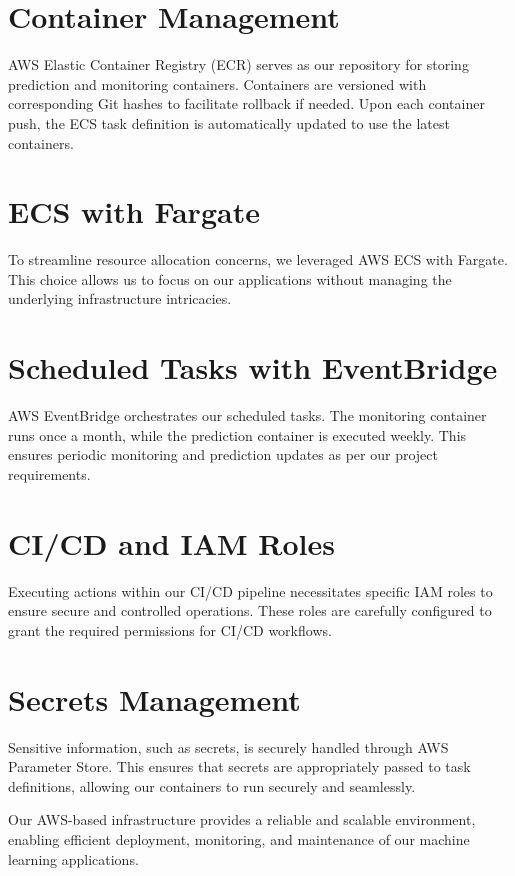 \documentclass{report}
\begin{document}
\section{Container Management}

AWS Elastic Container Registry (ECR) serves as our repository for storing prediction and monitoring containers. Containers are versioned with corresponding Git hashes to facilitate rollback if needed. Upon each container push, the ECS task definition is automatically updated to use the latest containers.

\section{ECS with Fargate}

To streamline resource allocation concerns, we leveraged AWS ECS with Fargate. This choice allows us to focus on our applications without managing the underlying infrastructure intricacies.

\section{Scheduled Tasks with EventBridge}

AWS EventBridge orchestrates our scheduled tasks. The monitoring container runs once a month, while the prediction container is executed weekly. This ensures periodic monitoring and prediction updates as per our project requirements.

\section{CI/CD and IAM Roles}

Executing actions within our CI/CD pipeline necessitates specific IAM roles to ensure secure and controlled operations. These roles are carefully configured to grant the required permissions for CI/CD workflows.

\section{Secrets Management}

Sensitive information, such as secrets, is securely handled through AWS Parameter Store. This ensures that secrets are appropriately passed to task definitions, allowing our containers to run securely and seamlessly.

Our AWS-based infrastructure provides a reliable and scalable environment, enabling efficient deployment, monitoring, and maintenance of our machine learning applications.
\end{document}

